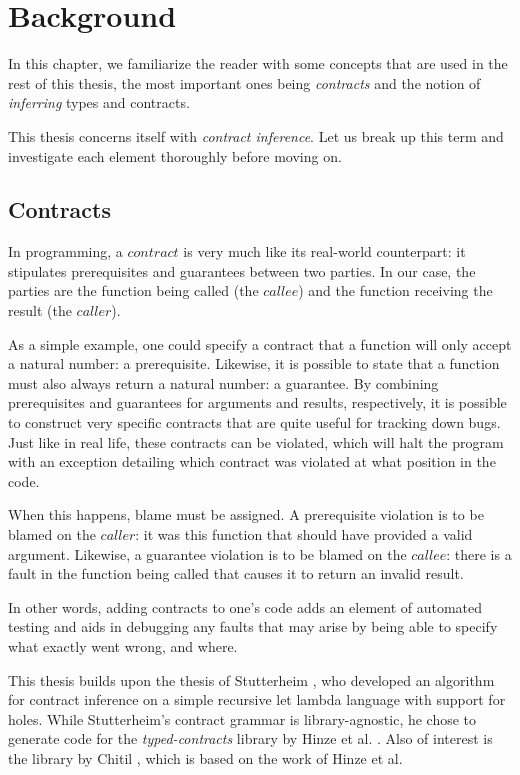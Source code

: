\documentclass[10pt]{report}
\begin{document}
\chapter{Background}

In this chapter, we familiarize the reader with some concepts that are used in the rest of this thesis, the most important ones being \textit{contracts} and the notion of \textit{inferring} types and contracts.

This thesis concerns itself with \textit{contract inference}.
Let us break up this term and investigate each element thoroughly before moving on.

\section{Contracts}
In programming, a $contract$ is very much like its real-world counterpart: it stipulates prerequisites and guarantees between two parties.
In our case, the parties are the function being called (the $callee$) and the function receiving the result (the $caller$).

As a simple example, one could specify a contract that a function will only accept a natural number: a prerequisite.
Likewise, it is possible to state that a function must also always return a natural number: a guarantee.
By combining prerequisites and guarantees for arguments and results, respectively, it is possible to construct very specific contracts that are quite useful for tracking down bugs.
Just like in real life, these contracts can be violated, which will halt the program with an exception detailing which contract was violated at what position in the code.

When this happens, blame must be assigned.
A prerequisite violation is to be blamed on the $caller$: it was this function that should have provided a valid argument.
Likewise, a guarantee violation is to be blamed on the $callee$: there is a fault in the function being called that causes it to return an invalid result.

In other words, adding contracts to one's code adds an element of automated testing and aids in debugging any faults that may arise by being able to specify what exactly went wrong, and where.

This thesis builds upon the thesis of Stutterheim \cite{Stutterheim:2013:thesis}, who developed an algorithm for contract inference on a simple recursive let lambda language with support for holes.
While Stutterheim's contract grammar is library-agnostic, he chose to generate code for the \textit{typed-contracts} library by Hinze et al. \cite{Hinze06typedcontracts}. 
Also of interest is the library by Chitil \cite{Chitil:2012ua}, which is based on the work of Hinze et al.
\end{document}

